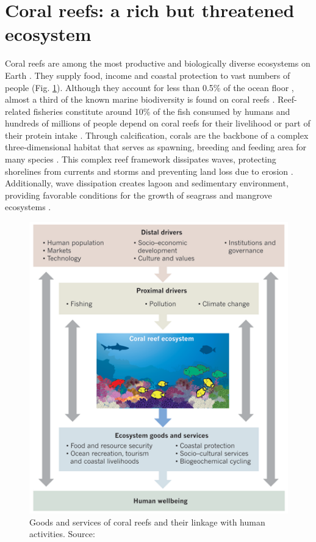 \section{Coral reefs: a rich but threatened ecosystem}

Coral reefs are among the most productive and biologically diverse ecosystems on Earth \citep{connell1978diversity, moberg1999ecological}. They supply food, income and coastal protection to vast numbers of people (Fig. \ref{intro:corals}). Although they account for less than 0.5\% of the ocean floor \citep{spalding1997new}, almost a third of the known marine biodiversity is found on coral reefs \citep{moberg1999ecological}. Reef-related fisheries constitute around 10\% of the fish consumed by humans \citep{smith1978coral} and hundreds of millions of people depend on coral reefs for their livelihood or part of their protein intake \citep{salvat1992coral,hoegh2019people}. Through calcification, corals are the backbone of a complex three-dimensional habitat that serves as spawning, breeding and feeding area for many species \citep{moberg1999ecological}. This complex reef framework  dissipates waves, protecting shorelines from currents and storms and preventing land loss due to erosion \citep{ferrario2014effectiveness,elliff2017coral}. Additionally, wave dissipation creates lagoon and sedimentary environment, providing favorable conditions for the growth of seagrass and mangrove ecosystems \citep{moberg1999ecological}.

\begin{figure}
    \centering
    \includegraphics[width=.8\textwidth]{chapters/intro/figures/anthropocene.png}
    \caption{Goods and services of coral reefs and their linkage with human activities. Source: \cite{hughes2017coral}}
    \label{intro:corals}
\end{figure}

